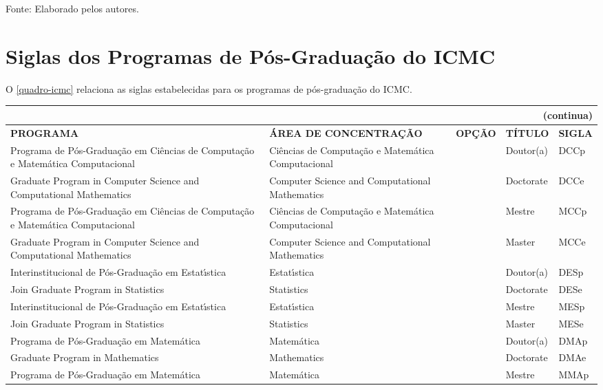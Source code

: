 \begin{apendicesenv}
\begin{quadro}[htb]
\begin{tabular}{|p{3.5cm}|p{3.5cm}|p{3.5cm}|p{1.5cm}|p{2.25cm}|}
\end{tabular}
\begin{flushleft}
		Fonte: Elaborado pelos autores.\
\end{flushleft}
\end{quadro}

\chapter{Siglas dos Programas de P\'os-Gradua\c{c}\~ao do ICMC}
O \autoref{quadro-icmc} relaciona as siglas estabelecidas para os programas de p\'os-gradua\c{c}\~ao do ICMC.
\begin{quadro}[htb]
\ABNTEXfontereduzida
\caption[Siglas dos Programas de P\'os-Gradua\c{c}\~ao do ICMC]{Siglas dos Programas de P\'os-Gradua\c{c}\~ao do ICMC}
\label{quadro-icmc}
\begin{tabular}{|p{3.5cm}|p{3.5cm}|p{2.5cm}|p{2.5cm}|p{2.25cm}|}
  \multicolumn{5}{r}{{(continua)}} \\ 
  \hline
   \textbf{PROGRAMA} & \textbf{\'AREA DE CONCENTRA\c{C}\~AO} & \textbf{OP\c{C}\~AO} & \textbf{T\'ITULO} & \textbf{SIGLA}  \\
    \hline 
		Programa de P\'os-Gradua\c{c}\~ao em Ci\^encias de Computa\c{c}\~ao e Matem\'atica Computacional & Ci\^encias de Computa\c{c}\~ao e Matem\'atica Computacional	&   &	Doutor(a)	 & DCCp\\
		Graduate Program in Computer Science and Computational Mathematics & Computer Science and Computational Mathematics	&   &	Doctorate & DCCe\\
	    Programa de P\'os-Gradua\c{c}\~ao em Ci\^encias de Computa\c{c}\~ao e Matem\'atica Computacional & Ci\^encias de Computa\c{c}\~ao e Matem\'atica Computacional	&   &	Mestre	& MCCp\\
	    Graduate Program in Computer Science and Computational Mathematics & Computer Science and Computational Mathematics &  & Master & MCCe\\
	    Interinstitucional de P\'os-Gradua\c{c}\~ao em Estat\'{\i}stica & Estat\'{\i}stica &  & Doutor(a)	 & DESp\\
		Join Graduate Program in Statistics & Statistics &  & Doctorate & 	DESe\\
		Interinstitucional de P\'os-Gradua\c{c}\~ao em Estat\'{\i}stica & Estat\'{\i}stica &  & Mestre & MESp\\
		Join Graduate Program in Statistics & Statistics &  & Master & MESe\\
		Programa de P\'os-Gradua\c{c}\~ao em Matem\'atica  & Matem\'atica &   &	Doutor(a) & DMAp\\
		Graduate Program in Mathematics & Mathematics &   & Doctorate & DMAe\\
		Programa de P\'os-Gradua\c{c}\~ao em Matem\'atica  & Matem\'atica &   &	Mestre & MMAp\\


\end{tabular}
\end{quadro}
\end{apendicesenv}
